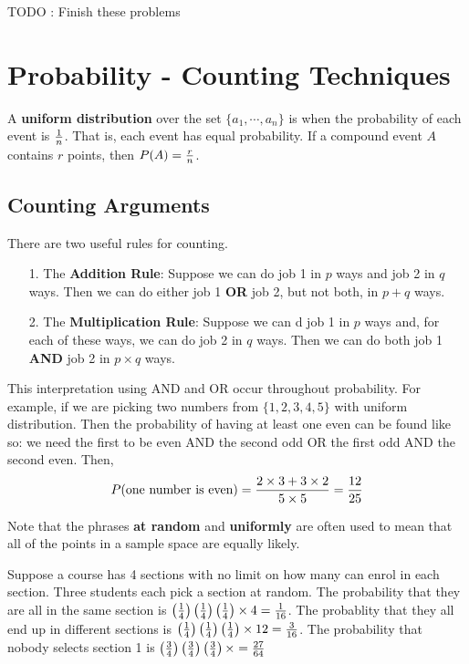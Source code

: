 \documentclass[english, 11pt]{article}
\begin{document}
  TODO : Finish these problems

  \section{Probability - Counting Techniques}

  \begin{defn}
    A \textbf{uniform distribution} over the set $\{ a_1, \cdots, a_n \}$ is when the probability of each event is $\frac{1}{n}$. That is, each event has equal probability. If a compound event $A$ contains $r$ points, then $P(A) = \frac{r}{n}$.
  \end{defn}

  \subsection{Counting Arguments}

  There are two useful rules for counting.

  \begin{itemize}
    \item[1.] The \textbf{Addition Rule}: Suppose we can do job 1 in $p$ ways and job 2 in $q$ ways. Then we can do either job 1 \textbf{OR} job 2, but not both, in $p + q$ ways.
    \item[2.] The \textbf{Multiplication Rule}: Suppose we can d job 1 in $p$ ways and, for each of these ways, we can do job 2 in $q$ ways. Then we can do both job 1 \textbf{AND} job 2 in $p \times q$ ways.
  \end{itemize}

  This interpretation using AND and OR occur throughout probability. For example, if we are picking two numbers from $\{ 1,2,3,4,5 \}$ with uniform distribution. Then the probability of having at least one even can be found like so: we need the first to be even AND the second odd OR the first odd AND the second even. Then,
  \[ P(\mbox{one number is even}) = \frac{2\times3+3\times2}{5\times5} = \frac{12}{25} \]

  Note that the phrases \textbf{at random} and \textbf{uniformly} are often used to mean that all of the points in a sample space are equally likely.

  \begin{exmp}
    Suppose a course has 4 sections with no limit on how many can enrol in each section. Three students each pick a section at random. The probability that they are all in the same section is $\left(\frac{1}{4}\right)\left(\frac{1}{4}\right)\left(\frac{1}{4}\right) \times 4 = \frac{1}{16}$. The probablity that they all end up in different sections is $\left(\frac{1}{4}\right)\left(\frac{1}{4}\right)\left(\frac{1}{4}\right)\times 12 = \frac{3}{16}$. The probability that nobody selects section 1 is $\left(\frac{3}{4}\right)\left(\frac{3}{4}\right)\left(\frac{3}{4}\right)\times = \frac{27}{64}$ \\
  \end{exmp}
\end{document}
